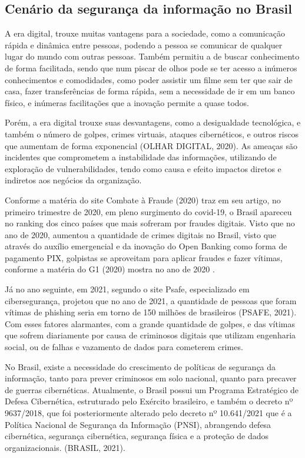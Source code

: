 \documentclass[
	12pt,				%
	openright,			%
	oneside,			%
	a4paper,			%
	english,			%
	french,				%
	spanish,			%
	brazil,				%
	]{abntex2}
\begin{document}
\subsection{Cenário da segurança da informação no Brasil}

A era digital, trouxe muitas vantagens para a sociedade, como a comunicação rápida e dinâmica entre pessoas, podendo a pessoa se comunicar de qualquer lugar do mundo com outras pessoas. Também permitiu a de buscar conhecimento de forma facilitada, sendo que num piscar de olhos pode se ter acesso a inúmeros conhecimentos e comodidades, como poder assistir um filme sem ter que sair de casa, fazer transferências de forma rápida, sem a necessidade de ir em um banco físico, e inúmeras facilitações que a inovação permite a quase todos.

Porém, a era digital trouxe suas desvantagens, como a desigualdade tecnológica, e também o número de golpes, crimes virtuais, ataques cibernéticos, e outros riscos que aumentam de forma exponencial (OLHAR DIGITAL, 2020). As ameaças são incidentes que comprometem a instabilidade das informações, utilizando de exploração de vulnerabilidades, tendo como causa e efeito impactos diretos e indiretos aos negócios da organização.

Conforme a matéria do site Combate à Fraude (2020) traz em seu artigo, no primeiro trimestre de 2020, em pleno surgimento do covid-19, o Brasil apareceu no ranking dos cinco países que mais sofreram por fraudes digitais. Visto que no ano de 2020, aumentou a quantidade de crimes digitais no Brasil, visto que através do auxílio emergencial e da inovação do Open Banking como forma de pagamento PIX, golpistas se aproveitam para aplicar fraudes e fazer vítimas, conforme a matéria do G1 (2020) mostra no ano de 2020 .

Já no ano seguinte, em 2021, segundo o site Psafe, especializado em cibersegurança, projetou que no ano de 2021, a quantidade de pessoas que foram vítimas de phishing seria em torno de 150 milhões de brasileiros (PSAFE, 2021). Com esses fatores alarmantes, com a grande quantidade de golpes, e das vítimas que sofrem diariamente por causa de criminosos digitais que utilizam engenharia social, ou de falhas e vazamento de dados para cometerem crimes. 

No Brasil, existe a necessidade do crescimento de políticas de segurança da informação, tanto para prever criminosos em solo nacional, quanto para precaver de guerras cibernéticas. Atualmente, o Brasil possui um Programa Estratégico de Defesa Cibernética, estruturado pelo Exército brasileiro, e também o decreto nº 9637/2018, que foi posteriormente alterado pelo decreto nº 10.641/2021 que é a Política Nacional de Segurança da Informação (PNSI), abrangendo defesa cibernética, segurança cibernética, segurança física e a proteção de dados organizacionais. (BRASIL, 2021).
\end{document}
